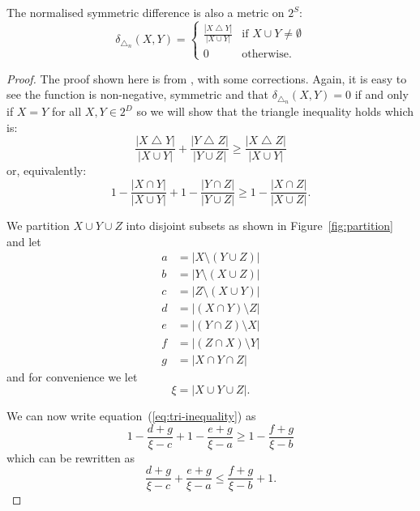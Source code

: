 \documentclass[a4paper]{report}
\DeclareMathOperator{\symdif}{\bigtriangleup}
\newcommand{\dset}{D}
\begin{document}
The normalised symmetric difference is also a metric on $2^{S}$:
\begin{equation*}
  \delta_{\symdif_n}(X,Y) =
  \begin{cases}
    \displaystyle \frac{|X \symdif Y|}{|X \cup Y|} & \text{if $X \cup Y \neq
      \emptyset$} \\
    0 & \text{otherwise.}
  \end{cases}
\end{equation*}

\begin{proof}
  The proof shown here is from \citep{yianilos91}, with some corrections.
  Again, it is easy to see the function is non-negative, symmetric and that
  $\delta_{\symdif_n}(X,Y)=0$ if and only if $X=Y$ for all $X,Y \in 2^{\dset}$
  so we will show that the triangle inequality holds which is:
  \begin{equation*}
    \frac{|X \symdif Y|}{|X \cup Y|} + \frac{|Y \symdif Z|}{|Y \cup Z|} \geq
    \frac{|X \symdif Z|}{|X \cup Y|}
  \end{equation*}
  or, equivalently:
  \begin{equation}
    \label{eq:tri-inequality}
    1 - \frac{|X \cap Y|}{|X \cup Y|} +
    1 - \frac{|Y \cap Z|}{|Y \cup Z|} \geq
    1 - \frac{|X \cap Z|}{|X \cup Z|}.
  \end{equation}

  We partition $X \cup Y \cup Z$ into disjoint subsets as shown in
  Figure~\ref{fig:partition} and let
  \begin{align*}
    a &= |X \setminus (Y \cup Z)|\\
    b &= |Y \setminus (X \cup Z)|\\
    c &= |Z \setminus (X \cup Y)|\\
    d &= |(X \cap Y) \setminus Z|\\
    e &= |(Y \cap Z) \setminus X|\\
    f &= |(Z \cap X) \setminus Y|\\
    g &= |X \cap Y \cap Z|
  \end{align*}
  and for convenience we let
  \begin{equation*}
    \xi  = |X \cup Y \cup Z|.
  \end{equation*}

  We can now write equation~(\ref{eq:tri-inequality}) as
  \begin{equation*}
    1 - \frac{d+g}{\xi -c} + 1 - \frac{e+g}{\xi -a} \geq 1 - \frac{f+g}{\xi -b}
  \end{equation*}
  which can be rewritten as
  \begin{equation*}
    \frac{d+g}{\xi -c} + \frac{e+g}{\xi -a} \leq \frac{f+g}{\xi -b} + 1.
  \end{equation*}


\end{proof}
\end{document}
